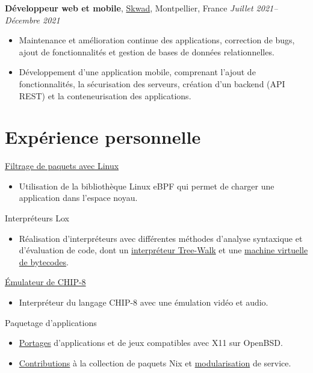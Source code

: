 \documentclass[margin,line]{../res}
\begin{document}
\begin{resume}
	{\bf Développeur web et mobile}, \href{https://skwad.com/}{Skwad}, Montpellier, France
	\hfill {\it Juillet 2021--Décembre 2021}
	\vspace*{.05in}
	\begin{itemize}
		\item Maintenance et amélioration continue des applications, correction de bugs, ajout de fonctionnalités et gestion de bases de données relationnelles.
		\item Développement d'une application mobile, comprenant l'ajout de fonctionnalités, la sécurisation des serveurs, création d'un backend (API REST) et la conteneurisation des applications.
	\end{itemize}

	\section{\sc Expérience personnelle}

	\href{https://github.com/theobori/tinyfilter}{Filtrage de paquets avec Linux}
	\begin{itemize}
		\item Utilisation de la bibliothèque Linux eBPF qui permet de charger une application dans l'espace noyau.
	\end{itemize}

	Interpréteurs Lox
	\begin{itemize}
		\item Réalisation d'interpréteurs avec différentes méthodes d'analyse syntaxique et d'évaluation de code, dont un \href{https://github.com/theobori/tinylox}{interpréteur Tree-Walk} et une \href{https://github.com/theobori/lox-virtual-machine}{machine virtuelle de bytecodes}.
	\end{itemize}


	\href{https://github.com/theobori/tinychip}{Émulateur de CHIP-8}
	\begin{itemize}
		\item Interpréteur du langage CHIP-8 avec une émulation vidéo et audio.
	\end{itemize}

	Paquetage d'applications
	\begin{itemize}
		\item \href{https://github.com/theobori/openbsd-ports}{Portages} d'applications et de jeux compatibles avec X11 sur OpenBSD.
		\item \href{https://repology.org/maintainer/theo1.bori@epitech.eu}{Contributions} à la collection de paquets Nix et \href{https://github.com/theobori/nix-teeworlds}{modularisation} de service.
	\end{itemize}


\end{resume}
\end{document}
